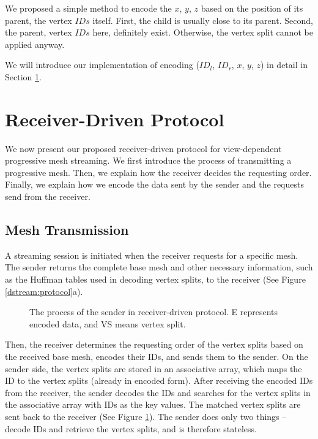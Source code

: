     We proposed a simple method to encode the $x$, $y$, $z$ based on the position
    of its parent, the vertex $IDs$ itself. First, the child is usually close to its
    parent. Second, the parent, vertex $IDs$ here, definitely exist. Otherwise, the vertex
    split cannot be applied anyway. 

    We will introduce our implementation of encoding ($ID_l$, $ID_r$, $x$, $y$, $z$) 
    in detail in Section \ref{s:dstream:protocol}.

\section{Receiver-Driven Protocol}
     \label{s:dstream:protocol}
	 We now present our proposed receiver-driven protocol
     for view-dependent progressive mesh streaming.
     We first introduce the process of transmitting 
     a progressive mesh. Then, we explain how the receiver decides the requesting order.
     Finally, we explain how we encode the data sent by the sender and the requests send from the receiver.
     
     \subsection{Mesh Transmission} 
     A streaming session is initiated when the receiver requests for a specific
     mesh.
     The sender returns the complete base mesh and other necessary information,
     such as the Huffman tables used in decoding vertex splits, to the receiver
     (See Figure \ref{dstream:protocol}a).
     
     \begin{figure}
     \centering
     \caption[The process of the sender in receiver-driven protocol.]{The process of the sender in receiver-driven protocol. 
     E represents encoded data, and VS means vertex split. \label{dstream:process}}
     \end{figure}
     Then, the receiver determines
     the requesting order of the vertex splits based on the received base mesh, 
     encodes their IDs, and
     sends them to the sender. On the sender side, the vertex splits are stored
     in an associative array, which maps the ID to the vertex splits (already in encoded form). 
     After receiving the encoded IDs from the receiver, 
     the sender decodes the IDs and searches for the vertex splits 
     in the associative array
     with IDs as the key values. The matched vertex splits
     are sent back to the receiver (See Figure \ref{dstream:process}). 
     The sender does only two things -- decode IDs and retrieve the 
     vertex splits, and is therefore stateless. 

